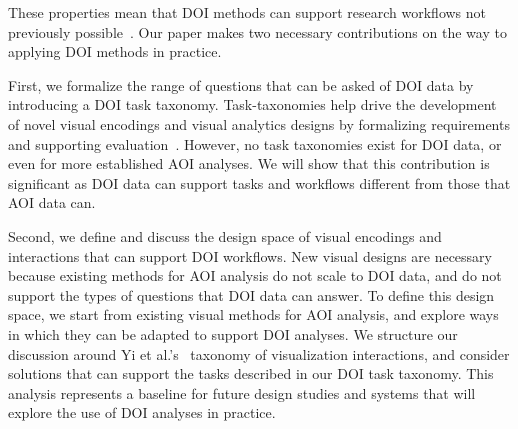These properties mean that DOI methods can support research workflows not previously possible~\cite{alam15analyzing, sundstedt2013visual, bernhard2014gaze}. Our paper makes two necessary contributions on the way to applying DOI methods in practice.
 
First, we formalize the range of questions that can be asked of DOI data by introducing a DOI task taxonomy. Task-taxonomies help drive the development of novel visual encodings and visual analytics designs by formalizing requirements and supporting evaluation~\cite{amar2005low,okoe2015graphunit}. However, no task taxonomies exist for DOI data, or even for more established AOI analyses. We will show that this contribution is significant as DOI data can support tasks and workflows different from those that AOI data can.

Second, we define and discuss the design space of visual encodings and interactions that can support DOI workflows. New visual designs are necessary because existing methods for AOI analysis do not scale to DOI data, and do not support the types of questions that DOI data can answer. To define this design space, we start from existing visual methods for AOI analysis, and explore ways in which they can be adapted to support DOI analyses. We structure our discussion around Yi et al.'s~\cite{yi2007toward} taxonomy of visualization interactions, and consider solutions that can support the tasks described in our DOI task taxonomy. This analysis represents a baseline for future design studies and systems that will explore the use of DOI analyses in practice.


